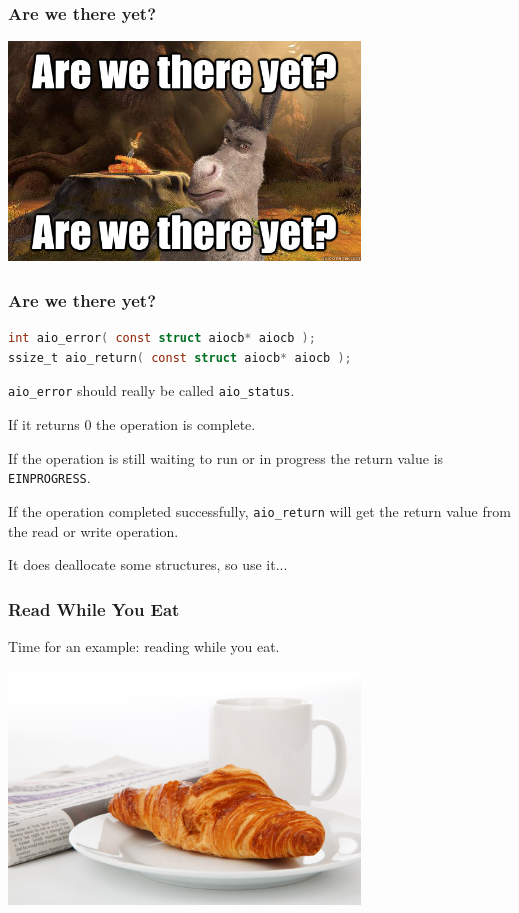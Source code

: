 \begin{frame}
	\frametitle{Are we there yet?}

	\begin{center}
		\includegraphics[width=0.7\textwidth]{images/arewethereyet.jpg}
	\end{center}

\end{frame}


\begin{frame}[fragile]
	\frametitle{Are we there yet?}

	\begin{lstlisting}[language=C]
int aio_error( const struct aiocb* aiocb );
ssize_t aio_return( const struct aiocb* aiocb );
\end{lstlisting}

	\texttt{aio\_error} should really be called \texttt{aio\_status}.

	If it returns 0 the operation is complete.

	If the operation is still waiting to run or in progress the return value is \texttt{EINPROGRESS}.

	If the operation completed successfully, \texttt{aio\_return} will get the return value from the read or write operation.

	It does deallocate some structures, so use it...

\end{frame}


\begin{frame}
	\frametitle{Read While You Eat}

	Time for an example: reading while you eat.

	\begin{center}
		\includegraphics[width=0.7\textwidth]{images/croissant-newspaper-and-tea.jpg}
	\end{center}

\end{frame}


